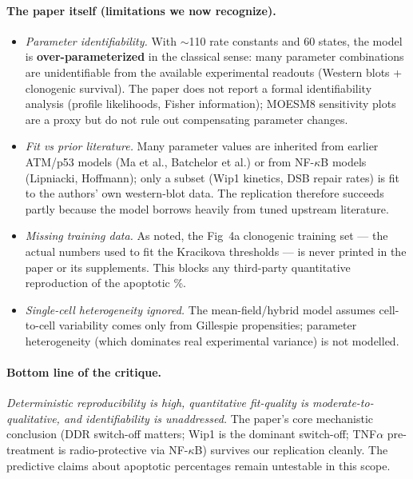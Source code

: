 \documentclass[11pt]{article}
\begin{document}
\paragraph{The paper itself (limitations we now recognize).}
\begin{itemize}
  \item \emph{Parameter identifiability.} With $\sim$110 rate constants and
        60 states, the model is \textbf{over-parameterized} in the classical
        sense: many parameter combinations are unidentifiable from the
        available experimental readouts (Western blots + clonogenic survival).
        The paper does not report a formal identifiability analysis (profile
        likelihoods, Fisher information); MOESM8 sensitivity plots are a proxy
        but do not rule out compensating parameter changes.
  \item \emph{Fit vs prior literature.} Many parameter values are inherited
        from earlier ATM/p53 models (Ma et al., Batchelor et al.) or from
        NF-$\kappa$B models (Lipniacki, Hoffmann); only a subset (Wip1 kinetics,
        DSB repair rates) is fit to the authors' own western-blot data. The
        replication therefore succeeds partly because the model borrows
        heavily from tuned upstream literature.
  \item \emph{Missing training data.} As noted, the Fig~4a clonogenic training
        set --- the actual numbers used to fit the Kracikova thresholds --- is
        never printed in the paper or its supplements. This blocks any
        third-party quantitative reproduction of the apoptotic \%.
  \item \emph{Single-cell heterogeneity ignored.} The mean-field/hybrid model
        assumes cell-to-cell variability comes only from Gillespie propensities;
        parameter heterogeneity (which dominates real experimental variance) is
        not modelled.
\end{itemize}

\paragraph{Bottom line of the critique.} \emph{Deterministic reproducibility
is high, quantitative fit-quality is moderate-to-qualitative, and identifiability
is unaddressed.} The paper's core mechanistic conclusion (DDR switch-off
matters; Wip1 is the dominant switch-off; TNF$\alpha$ pre-treatment is
radio-protective via NF-$\kappa$B) survives our replication cleanly. The
predictive claims about apoptotic percentages remain untestable in this scope.
\end{document}
